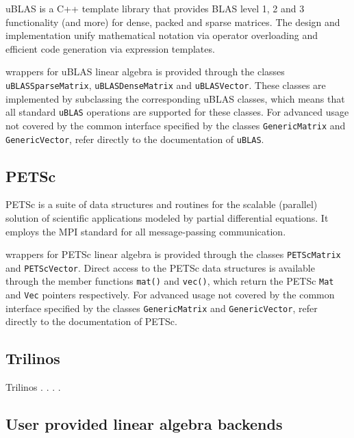 uBLAS is a C++ template library that provides BLAS level 1, 2 and 3
functionality (and more) for dense, packed and sparse matrices.
The design and implementation unify mathematical notation via operator
overloading and efficient code generation via expression templates.

\dolfin{} wrappers for uBLAS linear algebra is provided through the
classes \texttt{uBLASSparseMatrix}, \texttt{uBLASDenseMatrix} and
\texttt{uBLASVector}. These classes are implemented by subclassing the
corresponding uBLAS classes, which means that all standard
\texttt{uBLAS} operations are supported for these classes. For
advanced usage not covered by the common \dolfin{} interface specified
by the classes \texttt{GenericMatrix} and \texttt{GenericVector},
refer directly to the documentation of \texttt{uBLAS}.
\subsection{PETSc}
%
PETSc is a suite of data structures and routines for the scalable
(parallel) solution of scientific applications modeled by partial
differential equations. It employs the MPI standard for all 
message-passing communication.

\dolfin{} wrappers for PETSc linear algebra is provided through the
classes \texttt{PETScMatrix} and \texttt{PETScVector}. Direct access
to the PETSc data structures is available through the member functions
\texttt{mat()} and \texttt{vec()}, which return the PETSc \texttt{Mat}
and \texttt{Vec} pointers respectively. For advanced usage not covered
by the common \dolfin{} interface specified by the classes
\texttt{GenericMatrix} and \texttt{GenericVector}, refer directly to
the documentation of PETSc.

\subsection{Trilinos}
%
Trilinos . . . . 
\subsection{User provided linear algebra backends}
%


